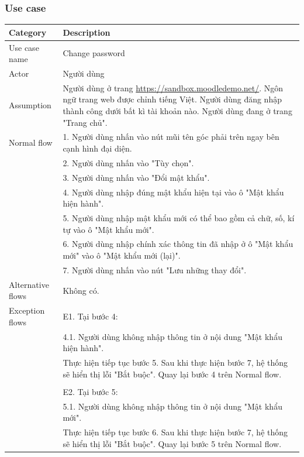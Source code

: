 \documentclass[a4paper, 12pt]{article}
\begin{document}
\subsubsection{Use case}
\begin{table}[H]
    \centering
    \begin{tabular}{|l|p{11cm}|}
        \hline
        Category & Description \\
        \hline
        Use case name & Change password \\
        \hline
        Actor & Người dùng \\
        \hline
        Assumption & Người dùng ở trang \url{https://sandbox.moodledemo.net/}. Ngôn ngữ trang web được chỉnh tiếng Việt. Người dùng đăng nhập thành công dưới bất kì tài khoản nào. Người dùng đang ở trang "Trang chủ". \\
        \hline
        Normal flow & 1. Người dùng nhấn vào nút mũi tên góc phải trên ngay bên cạnh hình đại diện. \\
        & 2. Người dùng nhấn vào "Tùy chọn". \\
        & 3. Người dùng nhấn vào "Đổi mật khẩu". \\
        & 4. Người dùng nhập đúng mật khẩu hiện tại vào ô "Mật khẩu hiện hành".\\
        & 5. Người dùng nhập mật khẩu mới có thể bao gồm cả chữ, số, kí tự vào ô "Mật khẩu mới".\\
        & 6. Người dùng nhập chính xác thông tin đã nhập ở ô "Mật khẩu mới" vào ô "Mật khẩu mới (lại)".\\
        & 7. Người dùng nhấn vào nút "Lưu những thay đổi". \\
        \hline
        Alternative flows & Không có. \\
        \hline
        Exception flows & E1. Tại bước 4: \\
        & 4.1. Người dùng không nhập thông tin ở nội dung "Mật khẩu hiện hành". \\ 
        & Thực hiện tiếp tục bước 5. Sau khi thực hiện bước 7, hệ thống sẽ hiển thị lỗi "Bắt buộc". Quay lại bước 4 trên Normal flow. \\
        & \\
        & E2. Tại bước 5: \\
        & 5.1. Người dùng không nhập thông tin ở nội dung "Mật khẩu mới". \\
        & Thực hiện tiếp tục bước 6. Sau khi thực hiện bước 7, hệ thống sẽ hiển thị lỗi "Bắt buộc". Quay lại bước 5 trên Normal flow. \\

\end{tabular}
\end{table}
\end{document}
